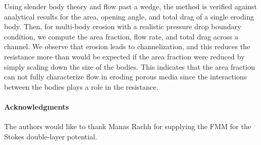 \documentclass[preprint, 10pt]{elsarticle}
\begin{document}
Using slender body theory and flow past a wedge, the method is verified
against analytical results for the area, opening angle, and total drag
of a single eroding body.  Then, for multi-body erosion with a realistic
pressure drop boundary condition, we compute the area fraction, flow
rate, and total drag across a channel.  We observe that erosion leads to
channelization, and this reduces the resistance more than would be
expected if the area fraction were reduced by simply scaling down the
size of the bodies.  This indicates that the area fraction can not fully
characterize flow in eroding porous media since the interactions between
the bodies plays a role in the resistance.



\paragraph{\bf Acknowledgments} The authors would like to thank Manas
Rachh for supplying the FMM for the Stokes double-layer potential.

 

\end{document}

